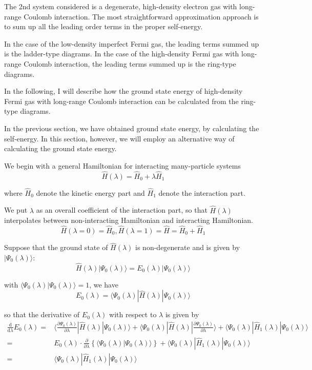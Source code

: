 The 2nd system considered is a degenerate, high-density electron gas with long-range Coulomb interaction.
The most straightforward approximation approach is to sum up all the leading order terms in the proper self-energy.

In the case of the low-density imperfect Fermi gas, the leading terms summed up is the ladder-type diagrams.
In the case of the high-density Fermi gas with long-range Coulomb interaction, the leading terms summed up is the ring-type diagrams.

In the following, I will describe how the ground state energy of high-density Fermi gas with long-range Coulomb interaction can be calculated from the ring-type diagrams.

In the previous section, we have obtained ground state energy, by calculating the self-energy.
In this section, however, we will employ an alternative way of calculating the ground state energy.

We begin with a general Hamiltonian for interacting many-particle systems
\[\hat{H}(\lambda) = \hat{H}_0+\lambda\hat{H}_1\]

where $\hat{H}_0$ denote the kinetic energy part and $\hat{H}_1$ denote the interaction part.

We put $\lambda$ as an overall coefficient of the interaction part, so that $\hat{H}(\lambda)$ interpolates between non-interacting Hamiltonian and interacting Hamiltonian.
\[ \hat{H}(\lambda=0)=\hat{H}_0,\hat{H}(\lambda=1)=\hat{H}=\hat{H}_0+\hat{H}_1 \]

Suppose that the ground state of $\hat{H}(\lambda)$ is non-degenerate and is given by $|\Psi_0(\lambda)\rangle$:
\[ \hat{H}(\lambda)|\Psi_0(\lambda)\rangle = E_0(\lambda)|\Psi_0(\lambda)\rangle \]

with $\langle \Psi_0(\lambda)|\Psi_0(\lambda) \rangle = 1$, we have
\[ E_0(\lambda) = \langle \Psi_0(\lambda)|\hat{H}(\lambda)|\Psi_0(\lambda) \rangle \]

so that the derivative of $E_0(\lambda)$ with respect to $\lambda$ is given by
\[\begin{split}
\frac{\mathrm{d}}{\mathrm{d}\lambda}E_0(\lambda)=&
\langle \frac{\partial \Psi_0(\lambda)}{\partial \lambda} | \hat{H}(\lambda) | \Psi_0(\lambda) \rangle + \langle \Psi_0(\lambda)  | \hat{H}(\lambda) | \frac{\partial \Psi_0(\lambda)}{\partial \lambda} \rangle +  \langle \Psi_0(\lambda)  | \hat{H}_1(\lambda) |  \Psi_0(\lambda)  \rangle\\
=& E_0(\lambda) \cdot \frac{\partial}{\partial \lambda} \left\{ \langle \Psi_0(\lambda) | \Psi_0(\lambda) \rangle \right\} +  \langle \Psi_0(\lambda)  | \hat{H}_1(\lambda) |  \Psi_0(\lambda)  \rangle\\
=& \langle \Psi_0(\lambda)  | \hat{H}_1(\lambda) |  \Psi_0(\lambda)  \rangle
\end{split}\]

